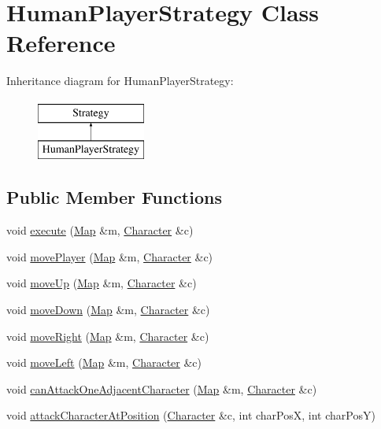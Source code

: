 \hypertarget{classHumanPlayerStrategy}{}\section{Human\+Player\+Strategy Class Reference}
\label{classHumanPlayerStrategy}
Inheritance diagram for Human\+Player\+Strategy\+:\begin{figure}[H]
\begin{center}
\leavevmode
\includegraphics[height=2.000000cm]{classHumanPlayerStrategy}
\end{center}
\end{figure}
\subsection*{Public Member Functions}
\begin{DoxyCompactItemize}
\item 
void \hyperlink{classHumanPlayerStrategy_a6bd8ba3a590ee457282f57074d66809d}{execute} (\hyperlink{classMap}{Map} \&m, \hyperlink{classCharacter}{Character} \&c)
\item 
void \hyperlink{classHumanPlayerStrategy_a2697fde934ee29e34a03191b7002726b}{move\+Player} (\hyperlink{classMap}{Map} \&m, \hyperlink{classCharacter}{Character} \&c)
\item 
void \hyperlink{classHumanPlayerStrategy_a95dee54912e432a9f716eb6b09a5373c}{move\+Up} (\hyperlink{classMap}{Map} \&m, \hyperlink{classCharacter}{Character} \&c)
\item 
void \hyperlink{classHumanPlayerStrategy_ac47c76361d47fd0429c5ccaa81f4ae3f}{move\+Down} (\hyperlink{classMap}{Map} \&m, \hyperlink{classCharacter}{Character} \&c)
\item 
void \hyperlink{classHumanPlayerStrategy_a6db6f603b2decabc42cf6e904457dac4}{move\+Right} (\hyperlink{classMap}{Map} \&m, \hyperlink{classCharacter}{Character} \&c)
\item 
void \hyperlink{classHumanPlayerStrategy_af235285084801301c8cf1bb9743d6469}{move\+Left} (\hyperlink{classMap}{Map} \&m, \hyperlink{classCharacter}{Character} \&c)
\item 
void \hyperlink{classHumanPlayerStrategy_ae2f29f9c391c7d8531f9df1c57c8dacf}{can\+Attack\+One\+Adjacent\+Character} (\hyperlink{classMap}{Map} \&m, \hyperlink{classCharacter}{Character} \&c)
\item 
void \hyperlink{classHumanPlayerStrategy_ab3050fd752d889f2b99ebe25e629e6eb}{attack\+Character\+At\+Position} (\hyperlink{classCharacter}{Character} \&c, int char\+PosX, int char\+PosY)
\end{DoxyCompactItemize}


